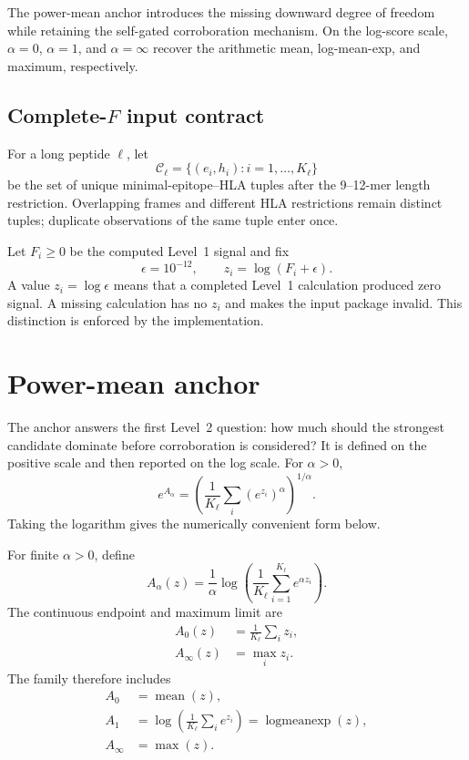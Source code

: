 \documentclass[11pt]{article}
\begin{document}
The power-mean anchor introduces the missing downward degree of freedom while
retaining the self-gated corroboration mechanism. On the log-score scale,
$\alpha=0$, $\alpha=1$, and $\alpha=\infty$ recover the arithmetic mean,
log-mean-exp, and maximum, respectively.

\subsection{Complete-$F$ input contract}

For a long peptide $\ell$, let
\[
\mathcal C_\ell=\{(e_i,h_i):i=1,\ldots,K_\ell\}
\]
be the set of unique minimal-epitope--HLA tuples after the 9--12-mer length
restriction. Overlapping frames and different HLA restrictions remain distinct
tuples; duplicate observations of the same tuple enter once.

Let $F_i\geq0$ be the computed Level~1 signal and fix
\[
\epsilon=10^{-12}, \qquad z_i=\log(F_i+\epsilon).
\]
A value $z_i=\log\epsilon$ means that a completed Level~1 calculation produced
zero signal. A missing calculation has no $z_i$ and makes the input package
invalid. This distinction is enforced by the implementation.

\section{Power-mean anchor}

The anchor answers the first Level~2 question: how much should the strongest
candidate dominate before corroboration is considered? It is defined on the
positive scale and then reported on the log scale. For $\alpha>0$,
\[
e^{A_\alpha}
=
\left(\frac{1}{K_\ell}\sum_i(e^{z_i})^\alpha\right)^{1/\alpha}.
\]
Taking the logarithm gives the numerically convenient form below.

For finite $\alpha>0$, define
\begin{equation}
A_\alpha(z)
=
\frac{1}{\alpha}
\log\left(\frac{1}{K_\ell}\sum_{i=1}^{K_\ell}e^{\alpha z_i}\right).
\label{eq:power-anchor}
\end{equation}
The continuous endpoint and maximum limit are
\begin{align}
A_0(z)&=\frac{1}{K_\ell}\sum_i z_i,\\
A_\infty(z)&=\max_i z_i.
\end{align}
The family therefore includes
\begin{align}
A_0&=\operatorname{mean}(z),\\
A_1&=\log\left(\frac{1}{K_\ell}\sum_i e^{z_i}\right)
     =\operatorname{logmeanexp}(z),\\
A_\infty&=\max(z).
\end{align}
\end{document}
